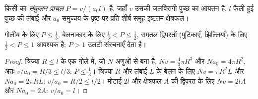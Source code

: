 \begin{definition}[संकुलन प्राचल]\label{def:b3:colloids:packing}
किसी  का \emph{संकुलन प्राचल} $P =
v/(a_0l)$ है, जहाँ $v$ उसकी जलविरागी पुच्छ का आयतन है, $l$ फैली हुई पुच्छ की
लंबाई और $a_0$ समुच्चय के पृष्ठ पर प्रति शीर्ष समूह इष्टतम क्षेत्रफल।
\end{definition}

\begin{proposition}[समुच्चयों की आकृति]\label{prop:b3:colloids:packing}
गोलीय  के लिए $P \le \frac13$, बेलनाकार  के लिए $\frac13 < P \le \frac12$, समतल द्विपरतों
(पुटिकाएँ, झिल्लियाँ) के लिए $\frac12 < P \le 1$ आवश्यक है; $P > 1$ उलटी संरचनाएँ देता है।
\end{proposition}

\begin{proof}
त्रिज्या $R \le l$ के एक गोले में, जो $N$ अणुओं से बना है, $Nv = \frac43\pi R^3$ और $Na_0 = 4\pi R^2$, अतः
$v/a_0 = R/3 \le l/3$: $P \le \frac13$। त्रिज्या $R$ और लंबाई $L$ के बेलन के लिए $Nv = \pi R^2L$ और
$Na_0 = 2\pi RL$: $v/a_0 = R/2 \le l/2$। मोटाई $2l$ और क्षेत्रफल $A$ की द्विपरत के लिए $Nv = 2lA$ और
$Na_0 = 2A$: $v/a_0 = l$।
\end{proof}

